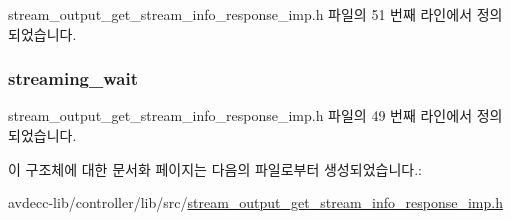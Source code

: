 stream\+\_\+output\+\_\+get\+\_\+stream\+\_\+info\+\_\+response\+\_\+imp.\+h 파일의 51 번째 라인에서 정의되었습니다.

\subsubsection[{\texorpdfstring{streaming\+\_\+wait}{streaming_wait}}]{ streaming\+\_\+wait}\hypertarget{structavdecc__lib_1_1stream__output__get__stream__info__response__imp_1_1stream__output__stream__info__flags_a454b567a37bea10315a3357b8f953eb5}{}\label{structavdecc__lib_1_1stream__output__get__stream__info__response__imp_1_1stream__output__stream__info__flags_a454b567a37bea10315a3357b8f953eb5}


stream\+\_\+output\+\_\+get\+\_\+stream\+\_\+info\+\_\+response\+\_\+imp.\+h 파일의 49 번째 라인에서 정의되었습니다.



이 구조체에 대한 문서화 페이지는 다음의 파일로부터 생성되었습니다.\+:\begin{DoxyCompactItemize}
\item 
avdecc-\/lib/controller/lib/src/\hyperlink{stream__output__get__stream__info__response__imp_8h}{stream\+\_\+output\+\_\+get\+\_\+stream\+\_\+info\+\_\+response\+\_\+imp.\+h}\end{DoxyCompactItemize}
